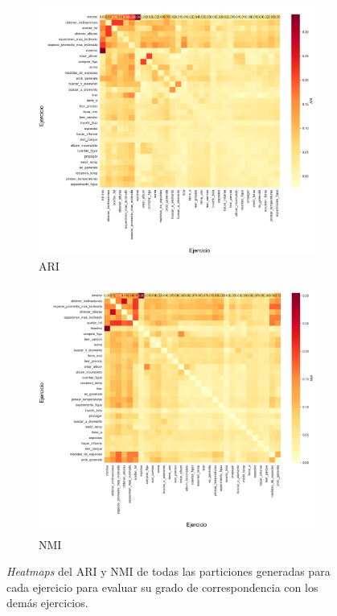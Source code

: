 \documentclass[11pt,a4paper,twoside,openany]{tesis}
\begin{document}
\begin{figure}
    \centering
    \begin{subfigure}{0.7\textwidth}
        \includegraphics[width=\linewidth]{imagenes/ari.png}
        \caption{ARI}
        \label{fig:figura1}
    \end{subfigure}
    \hfill
    \begin{subfigure}{0.7\textwidth}
        \includegraphics[width=\linewidth]{imagenes/nmi.png}
        \caption{NMI}
        \label{fig:figura2}
    \end{subfigure}
    \caption{\emph{Heatmaps} del ARI y NMI de todas las particiones generadas para cada ejercicio para evaluar su grado de correspondencia con los demás ejercicios.}
    \label{ari_nmi}
\end{figure}
\end{document}
